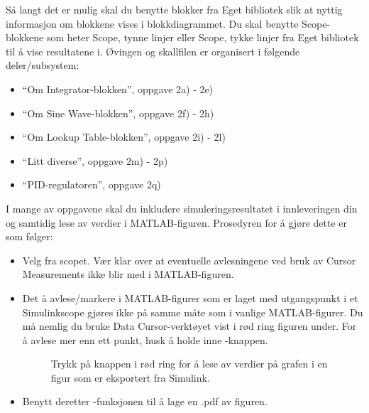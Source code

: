  Så langt
det er mulig skal du benytte blokker fra {\sf Eget bibliotek}
  slik at nyttig informasjon om blokkene vises i blokkdiagrammet. Du skal 
  benytte {\sf Scope}-blokkene som heter {\sf Scope, tynne linjer}
  eller {\sf Scope, tykke linjer}  fra {\sf Eget bibliotek} til å
  vise resultatene i.
  Øvingen og skallfilen er organisert  i følgende deler/subsystem:
  \vspace*{-5mm}
  \begin{itemize}
  \item ``Om {\sf Integrator}-blokken'', oppgave 2a) - 2e) 
  \item ``Om {\sf Sine Wave}-blokken'', oppgave 2f) - 2h) 
  \item ``Om {\sf Lookup Table}-blokken'',  oppgave 2i) - 2l) 
  \item ``Litt diverse'', oppgave 2m) - 2p)  
  \item ``PID-regulatoren'', oppgave 2q)  
  \end{itemize}


  
I mange av oppgavene skal du inkludere simuleringsresultatet i
innleveringen din og samtidig lese av verdier i MATLAB-figuren.
Prosedyren for å gjøre dette er som følger:
\begin{tcolorbox}[colback=yellow!5!white,colframe=yellow!75!black,
    title=Prosedyre for å lage figur fra
    Simulink-scope og deretter lese av verdier]
       \begin{itemize}
       \item Velg   fra scopet. Vær
         klar over at eventuelle  avlesningene ved bruk av  {\sf Cursor
           Measurements} ikke blir med i MATLAB-figuren.
       \item Det å avlese/markere i MATLAB-figurer som er laget med utgangspunkt i et
         Simulinkscope gjøres ikke på samme måte som i vanlige
         MATLAB-figurer. Du må nemlig du bruke {\sf Data Cursor}-verktøyet vist i rød ring figuren
         under. For  å avlese mer enn ett punkt, husk å holde inne -knappen.
         \begin{figure}[H]
           \centering
           \caption{Trykk på knappen i rød ring for å lese av verdier på grafen i en
             figur som er eksportert fra Simulink.  }
         \end{figure}  

       \item Benytt deretter -funksjonen til å lage en .pdf av
         figuren. 
       \end{itemize}
       
     \end{tcolorbox}

\label{page:prosedyre}

\newpage